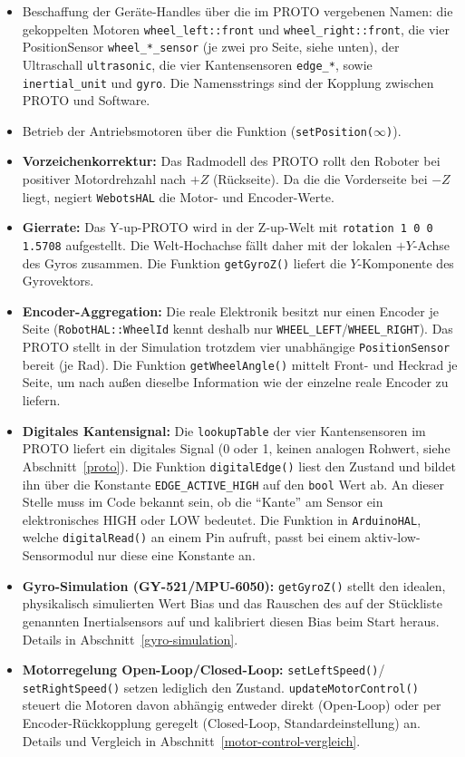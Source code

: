 \documentclass[
  a4paper,
  12pt,
  DIV=12,        %
  parskip=half,  %
  headings=small %
]{scrartcl}
\theoremstyle{definition}
\providecommand{\tightlist}{%
  \setlength{\itemsep}{0pt}\setlength{\parskip}{0pt}}
\theoremstyle{definition}
\begin{document}
\begin{itemize}
\tightlist
\item
  Beschaffung der Geräte-Handles über die im PROTO vergebenen Namen: die
  gekoppelten Motoren \texttt{wheel\_left::front} und
  \texttt{wheel\_right::front}, die vier PositionSensor
  \texttt{wheel\_*\_sensor} (je zwei pro Seite, siehe unten), der
  Ultraschall \texttt{ultrasonic}, die vier Kantensensoren \texttt{edge\_*},
  sowie \texttt{inertial\_unit} und \texttt{gyro}. Die Namensstrings sind
  der Kopplung zwischen PROTO und Software.
\item
  Betrieb der Antriebsmotoren über die Funktion
  (\texttt{setPosition(\ensuremath{\infty})}).
\item
  \textbf{Vorzeichenkorrektur:} Das Radmodell des PROTO rollt den
  Roboter bei positiver Motordrehzahl nach $+Z$ (Rückseite). Da die
  die Vorderseite bei $-Z$ liegt, negiert \texttt{WebotsHAL} die Motor- und
  Encoder-Werte.
\item
  \textbf{Gierrate:} Das Y-up-PROTO wird in der Z-up-Welt mit
  \texttt{rotation 1 0 0 1.5708} aufgestellt. Die Welt-Hochachse fällt
  daher mit der lokalen $+Y$-Achse des Gyros zusammen. Die Funktion
    \texttt{getGyroZ()} liefert die $Y$-Komponente des Gyrovektors.
\item
  \textbf{Encoder-Aggregation:} Die reale Elektronik besitzt nur einen
  Encoder je Seite (\texttt{RobotHAL::WheelId} kennt deshalb nur
  \texttt{WHEEL\_LEFT}/\texttt{WHEEL\_RIGHT}). Das PROTO stellt in der
  Simulation trotzdem vier unabhängige \texttt{PositionSensor} bereit (je
  Rad). Die Funktion \texttt{getWheelAngle()} mittelt Front- und Heckrad je
  Seite, um nach außen dieselbe Information wie der einzelne reale Encoder zu
  liefern.
\item
  \textbf{Digitales Kantensignal:} Die \texttt{lookupTable} der vier
  Kantensensoren im PROTO liefert ein digitales Signal (\num{0}
  oder \num{1}, keinen analogen Rohwert, siehe
  Abschnitt~\ref{proto}). Die Funktion  \texttt{digitalEdge()} liest den Zustand und
  bildet ihn über die Konstante \texttt{EDGE\_ACTIVE\_HIGH} auf
  den  \texttt{bool} Wert ab. An dieser Stelle muss im Code
  bekannt sein, ob die \enquote{Kante} am Sensor ein elektronisches  HIGH
  oder LOW bedeutet. Die Funktion in \texttt{ArduinoHAL}, welche
  \texttt{digitalRead()} an einem Pin aufruft, passt bei einem
  aktiv-low-Sensormodul nur diese eine Konstante an.
\item
  \textbf{Gyro-Simulation (GY-521/MPU-6050):} \texttt{getGyroZ()} stellt
  den idealen, physikalisch simulierten Wert Bias und das Rauschen des auf
  der Stückliste genannten Inertialsensors auf und kalibriert diesen
  Bias beim Start heraus. Details in Abschnitt~\ref{gyro-simulation}.
\item
  \textbf{Motorregelung Open-Loop/Closed-Loop:} \texttt{setLeftSpeed()}/
  \texttt{setRightSpeed()} setzen lediglich den Zustand.
  \texttt{updateMotorControl()} steuert die Motoren davon abhängig entweder
  direkt (Open-Loop) oder per Encoder-Rückkopplung geregelt (Closed-Loop,
  Standardeinstellung) an. Details und Vergleich in
  Abschnitt~\ref{motor-control-vergleich}.
\end{itemize}
\end{document}
